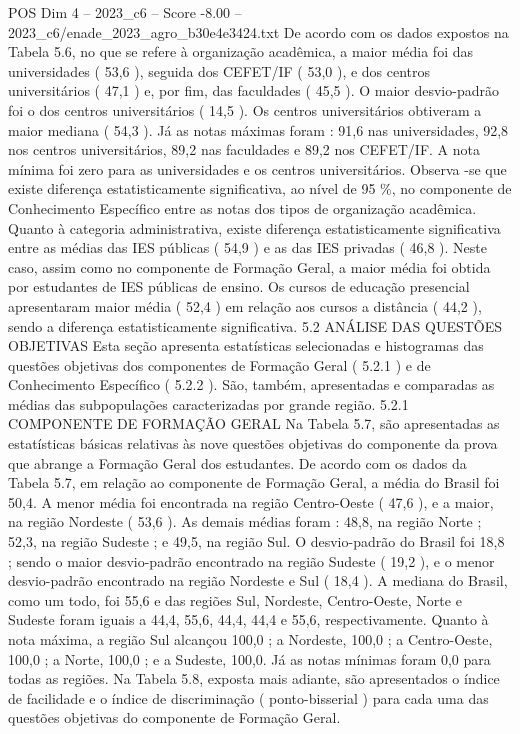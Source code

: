 \begin{textsample}{POS Dim 4 – 2023\_c6 – Score -8.00 – 2023\_c6/enade\_2023\_agro\_b30e4e3424.txt}
De acordo com os dados expostos na Tabela 5.6, no que se refere à organização acadêmica, a maior média foi das universidades ( 53,6 ), seguida dos CEFET/IF ( 53,0 ), e dos centros universitários ( 47,1 ) e, por fim, das faculdades ( 45,5 ).
O maior desvio-padrão foi o dos centros universitários ( 14,5 ).
Os centros universitários obtiveram a maior mediana ( 54,3 ).
Já as notas máximas foram : 91,6 nas universidades, 92,8 nos centros universitários, 89,2 nas faculdades e 89,2 nos CEFET/IF.
A nota mínima foi zero para as universidades e os centros universitários.
Observa -se que existe diferença estatisticamente significativa, ao nível de 95 \%, no componente de Conhecimento Específico entre as notas dos tipos de organização acadêmica.
Quanto à categoria administrativa, existe diferença estatisticamente significativa entre as médias das IES públicas ( 54,9 ) e as das IES privadas ( 46,8 ).
Neste caso, assim como no componente de Formação Geral, a maior média foi obtida por estudantes de IES públicas de ensino.
Os cursos de educação presencial apresentaram maior média ( 52,4 ) em relação aos cursos a distância ( 44,2 ), sendo a diferença estatisticamente significativa. 5.2 ANÁLISE DAS QUESTÕES OBJETIVAS Esta seção apresenta estatísticas selecionadas e histogramas das questões objetivas dos componentes de Formação Geral ( 5.2.1 ) e de Conhecimento Específico ( 5.2.2 ).
São, também, apresentadas e comparadas as médias das subpopulações caracterizadas por grande região. 5.2.1 COMPONENTE DE FORMAÇÃO GERAL Na Tabela 5.7, são apresentadas as estatísticas básicas relativas às nove questões objetivas do componente da prova que abrange a Formação Geral dos estudantes.
De acordo com os dados da Tabela 5.7, em relação ao componente de Formação Geral, a média do Brasil foi 50,4.
A menor média foi encontrada na região Centro-Oeste ( 47,6 ), e a maior, na região Nordeste ( 53,6 ).
As demais médias foram : 48,8, na região Norte ; 52,3, na região Sudeste ; e 49,5, na região Sul.
O desvio-padrão do Brasil foi 18,8 ; sendo o maior desvio-padrão encontrado na região Sudeste ( 19,2 ), e o menor desvio-padrão encontrado na região Nordeste e Sul ( 18,4 ).
A mediana do Brasil, como um todo, foi 55,6 e das regiões Sul, Nordeste, Centro-Oeste, Norte e Sudeste foram iguais a 44,4, 55,6, 44,4, 44,4 e 55,6, respectivamente.
Quanto à nota máxima, a região Sul alcançou 100,0 ; a Nordeste, 100,0 ; a Centro-Oeste, 100,0 ; a Norte, 100,0 ; e a Sudeste, 100,0.
Já as notas mínimas foram 0,0 para todas as regiões.
Na Tabela 5.8, exposta mais adiante, são apresentados o índice de facilidade e o índice de discriminação ( ponto-bisserial ) para cada uma das questões objetivas do componente de Formação Geral.

\end{textsample}
